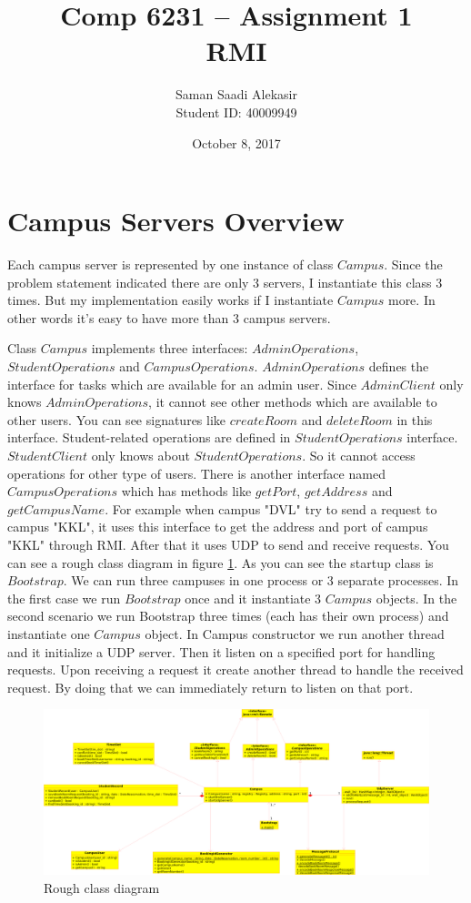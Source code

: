 \documentclass[12pt]{article}
\title{Comp 6231 -- Assignment 1\\RMI}
\author{Saman Saadi Alekasir\\Student ID: 40009949}
\date{October 8, 2017}
\begin{document}
\begin{titlepage}
\clearpage
\maketitle
\thispagestyle{empty}
\end{titlepage}
\section{Campus Servers Overview}
Each campus server is represented by one instance of class $Campus$. Since the problem statement indicated there are only 3 servers, I instantiate this class 3 times. But my implementation easily works if I instantiate $Campus$ more. In other words it's easy to have more than 3 campus servers.
\par Class $Campus$ implements three interfaces: $AdminOperations$, $StudentOperations$ and $CampusOperations$. $AdminOperations$ defines the interface for tasks which are available for an admin user. Since $AdminClient$ only knows $AdminOperations$, it cannot see other methods which are available to other users. You can see signatures like $createRoom$ and $deleteRoom$ in this interface. Student-related operations are defined in $StudentOperations$ interface. $StudentClient$ only knows about $StudentOperations$. So it cannot access operations for other type of users. There is another interface named $CampusOperations$ which has methods like $getPort$, $getAddress$ and $getCampusName$. For example when campus "DVL" try to send a request to campus "KKL", it uses this interface to get the address and port of campus "KKL" through RMI. After that it uses UDP to send and receive requests. You can see a rough class diagram in figure \ref{fig:class_diagram}. As you can see the startup class is $Bootstrap$. We can run three campuses in one process or 3 separate processes. In the first case we run $Bootstrap$ once and it instantiate 3 $Campus$ objects. In the second scenario we run Bootstrap three times (each has their own process) and instantiate one $Campus$ object. In Campus constructor we run another thread and it initialize a UDP server. Then it listen on a specified port for handling requests. Upon receiving a request it create another thread to handle the received request. By doing that we can immediately return to listen on that port.

\begin{figure}
\caption{Rough class diagram}
\centering
\label{fig:class_diagram}
\includegraphics[width=\linewidth]{img/class_diagram.png}
\end{figure}
\end{document}
